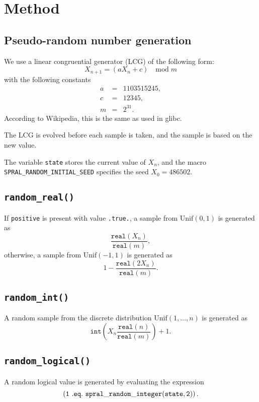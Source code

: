 \section{Method} \label{method}

\subsection{Pseudo-random number generation}
We use a linear congruential generator (LCG) of the following form:
$$
   X_{n+1} = (aX_n + c)\quad \mathrm{mod}\; m
$$
with the following constants
\begin{eqnarray*}
   a &=& 1103515245, \\
   c &=& 12345, \\
   m &=& 2^{31}.
\end{eqnarray*}
According to Wikipedia, this is the same as used in glibc.

The LCG is evolved before each sample is taken, and the sample is based on the
new value.

The variable \texttt{state} stores the current value of $X_n$, and the macro
\texttt{SPRAL\_RANDOM\_INITIAL\_SEED} specifies the seed $X_0 = 486502$.

\subsection{\tt random\_real()}
If {\tt positive} is present with value {\tt .true.}, a sample from $\mathrm{Unif}(0,1)$ is generated as
$$
   \frac{\texttt{real}(X_n)}{\texttt{real}(m)},
$$
otherwise, a sample from $\mathrm{Unif}(-1,1)$ is generated as
$$
   1 - \frac{\texttt{real}(2X_n)}{\texttt{real}(m)}.
$$

\subsection{\tt random\_int()}
A random sample from the discrete distribution $\mathrm{Unif}(1, \ldots, n)$ is
generated as
$$
   \texttt{int}\left( X_n \frac{\texttt{real}(n)}{\texttt{real}(m)} \right) + 1.
$$

\subsection{\tt random\_logical()}
A random logical value is generated by evaluating the expression
$$
\tt \left(1\ .eq.\ spral\_random\_integer(state, 2)\right).
$$



